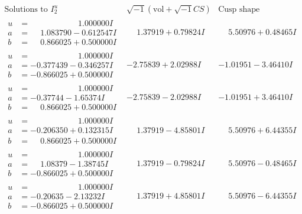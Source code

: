 \documentclass[1p]{elsarticle_modified}
\theoremstyle{definition}
\newcommand{\I}{\sqrt{-1}}
\begin{document}
$$\begin{array}{c|c|c}  
\text{Solutions to }I^u_{2}& \I (\text{vol} + \sqrt{-1}CS) & \text{Cusp shape}\\
 \hline 
\begin{aligned}
u &= \phantom{-0.000000 -}1.000000 I \\
a &= \phantom{-}1.083790 - 0.612547 I \\
b &= \phantom{-}0.866025 + 0.500000 I\end{aligned}
 & \phantom{-}1.37919 + 0.79824 I & \phantom{-}5.50976 + 0.48465 I \\ \hline\begin{aligned}
u &= \phantom{-0.000000 -}1.000000 I \\
a &= -0.377439 - 0.346257 I \\
b &= -0.866025 + 0.500000 I\end{aligned}
 & -2.75839 + 2.02988 I & -1.01951 - 3.46410 I \\ \hline\begin{aligned}
u &= \phantom{-0.000000 -}1.000000 I \\
a &= -0.37744 - 1.65374 I \\
b &= \phantom{-}0.866025 + 0.500000 I\end{aligned}
 & -2.75839 - 2.02988 I & -1.01951 + 3.46410 I \\ \hline\begin{aligned}
u &= \phantom{-0.000000 -}1.000000 I \\
a &= -0.206350 + 0.132315 I \\
b &= \phantom{-}0.866025 + 0.500000 I\end{aligned}
 & \phantom{-}1.37919 - 4.85801 I & \phantom{-}5.50976 + 6.44355 I \\ \hline\begin{aligned}
u &= \phantom{-0.000000 -}1.000000 I \\
a &= \phantom{-}1.08379 - 1.38745 I \\
b &= -0.866025 + 0.500000 I\end{aligned}
 & \phantom{-}1.37919 - 0.79824 I & \phantom{-}5.50976 - 0.48465 I \\ \hline\begin{aligned}
u &= \phantom{-0.000000 -}1.000000 I \\
a &= -0.20635 - 2.13232 I \\
b &= -0.866025 + 0.500000 I\end{aligned}
 & \phantom{-}1.37919 + 4.85801 I & \phantom{-}5.50976 - 6.44355 I \\ \hline\begin{aligned}

\end{aligned}
\end{array}$$
\end{document}
